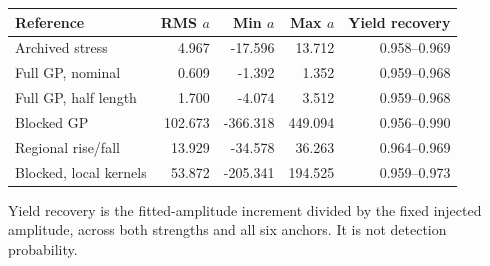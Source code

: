 \begin{center}\small\begin{tabular}{lrrrr}\toprule
Reference & RMS $a$ & Min $a$ & Max $a$ & Yield recovery\\\midrule
Archived stress & 4.967 & -17.596 & 13.712 & 0.958--0.969\\
Full GP, nominal & 0.609 & -1.392 & 1.352 & 0.959--0.968\\
Full GP, half length & 1.700 & -4.074 & 3.512 & 0.959--0.968\\
Blocked GP & 102.673 & -366.318 & 449.094 & 0.956--0.990\\
Regional rise/fall & 13.929 & -34.578 & 36.263 & 0.964--0.969\\
Blocked, local kernels & 53.872 & -205.341 & 194.525 & 0.959--0.973\\
\bottomrule\end{tabular}\end{center}
Yield recovery is the fitted-amplitude increment divided by the fixed injected amplitude, across both strengths and all six anchors. It is not detection probability.
